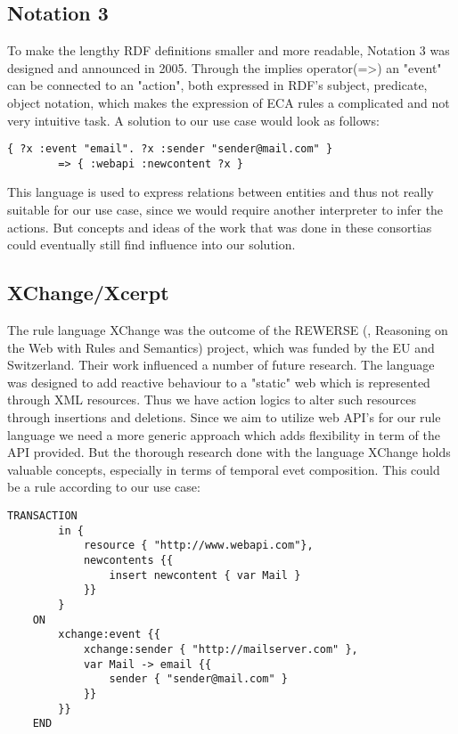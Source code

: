 \subsection{Notation 3}
To make the lengthy RDF definitions smaller and more readable, Notation 3\cite{wwwn3} was designed and announced in 2005. Through the implies operator(=\textgreater) an "event" can be connected to an "action", both expressed in RDF's subject, predicate, object notation, which makes the expression of ECA rules a complicated and not very intuitive task. A solution to our use case would look as follows:

\begin{lstlisting}[frame=single,float=h,label=lstn3,language=N3,caption=E-Mail Example rule expressed in Notation 3]
	{ ?x :event "email". ?x :sender "sender@mail.com" }
		=> { :webapi :newcontent ?x }
\end{lstlisting}

This language is used to express relations between entities and thus not really suitable for our use case, since we would require another interpreter to infer the actions. But concepts and ideas of the work that was done in these consortias could eventually still find influence into our solution.

\subsection{XChange/Xcerpt}
The rule language XChange\cite{2005-Patranjan-TLE.pdf} was the outcome of the REWERSE (\cite{wwwRewerse}, Reasoning on the Web with Rules and Semantics) project, which was funded by the EU and Switzerland. Their work influenced a number of future research. The language was designed to add reactive behaviour to a "static" web which is represented through XML resources. Thus we have action logics to alter such resources through insertions and deletions. Since we aim to utilize web API's for our rule language we need a more generic approach which adds flexibility in term of the API provided. But the thorough research done with the language XChange holds valuable concepts, especially in terms of temporal evet composition. This could be a rule according to our use case:

\begin{lstlisting}[frame=single,float=h,label=lstxchange1,language=XChange,caption=E-Mail Example rule expressed in XChange]
	TRANSACTION
		in {
			resource { "http://www.webapi.com"},
			newcontents {{
				insert newcontent { var Mail }
			}}
		}
	ON
		xchange:event {{
			xchange:sender { "http://mailserver.com" },
			var Mail -> email {{
				sender { "sender@mail.com" }
			}}
		}}
	END
\end{lstlisting}

